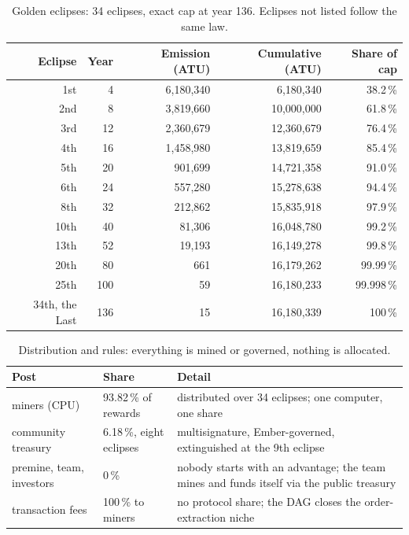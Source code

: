 \begin{table}[htbp]
\centering
\small
\caption{Golden eclipses: 34 eclipses, exact cap at year 136. Eclipses
not listed follow the same law.}
\label{tab:eclipses}
\begin{tabular}{@{}rrrrr@{}}
\toprule
Eclipse & Year & Emission (ATU) & Cumulative (ATU) & Share of cap \\
\midrule
1st & 4 & 6,180,340 & 6,180,340 & 38.2\,\% \\
2nd & 8 & 3,819,660 & 10,000,000 & 61.8\,\% \\
3rd & 12 & 2,360,679 & 12,360,679 & 76.4\,\% \\
4th & 16 & 1,458,980 & 13,819,659 & 85.4\,\% \\
5th & 20 & 901,699 & 14,721,358 & 91.0\,\% \\
6th & 24 & 557,280 & 15,278,638 & 94.4\,\% \\
8th & 32 & 212,862 & 15,835,918 & 97.9\,\% \\
10th & 40 & 81,306 & 16,048,780 & 99.2\,\% \\
13th & 52 & 19,193 & 16,149,278 & 99.8\,\% \\
20th & 80 & 661 & 16,179,262 & 99.99\,\% \\
25th & 100 & 59 & 16,180,233 & 99.998\,\% \\
34th, the Last & 136 & 15 & 16,180,339 & 100\,\% \\
\bottomrule
\end{tabular}
\end{table}

\begin{table}[htbp]
\centering
\small
\caption{Distribution and rules: everything is mined or governed,
nothing is allocated.}
\label{tab:distribution}
\begin{tabularx}{\textwidth}{@{}L{3.6cm}L{3.4cm}Y@{}}
\toprule
Post & Share & Detail \\
\midrule
miners (CPU) & 93.82\,\% of rewards & distributed over 34 eclipses; one computer, one share \\
community treasury & 6.18\,\%, eight eclipses & multisignature, Ember-governed, extinguished at the 9th eclipse \\
premine, team, investors & 0\,\% & nobody starts with an advantage; the team mines and funds itself via the public treasury \\
transaction fees & 100\,\% to miners & no protocol share; the DAG closes the order-extraction niche \\
\bottomrule
\end{tabularx}
\end{table}

